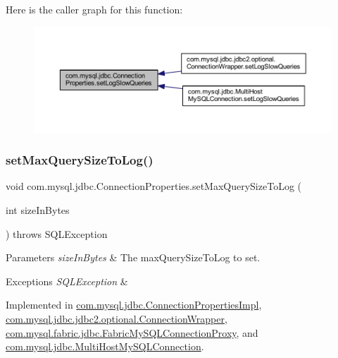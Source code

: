 Here is the caller graph for this function\+:\nopagebreak
\begin{figure}[H]
\begin{center}
\leavevmode
\includegraphics[width=350pt]{interfacecom_1_1mysql_1_1jdbc_1_1_connection_properties_a7dd83438187fa5956f663b84a604dce3_icgraph}
\end{center}
\end{figure}
\mbox{\label{interfacecom_1_1mysql_1_1jdbc_1_1_connection_properties_a65e15e4e1644fe1fb818777977237944}} 
\subsubsection{\texorpdfstring{set\+Max\+Query\+Size\+To\+Log()}{setMaxQuerySizeToLog()}}
{\footnotesize\ttfamily void com.\+mysql.\+jdbc.\+Connection\+Properties.\+set\+Max\+Query\+Size\+To\+Log (\begin{DoxyParamCaption}\item[{int}]{size\+In\+Bytes }\end{DoxyParamCaption}) throws S\+Q\+L\+Exception}


\begin{DoxyParams}{Parameters}
{\em size\+In\+Bytes} & The max\+Query\+Size\+To\+Log to set. \\
\hline
\end{DoxyParams}

\begin{DoxyExceptions}{Exceptions}
{\em S\+Q\+L\+Exception} & \\
\hline
\end{DoxyExceptions}


Implemented in \mbox{\hyperlink{classcom_1_1mysql_1_1jdbc_1_1_connection_properties_impl_a47edb53f9c786011c632b6aa2a524e93}{com.\+mysql.\+jdbc.\+Connection\+Properties\+Impl}}, \mbox{\hyperlink{classcom_1_1mysql_1_1jdbc_1_1jdbc2_1_1optional_1_1_connection_wrapper_ac2fc5533a1f39ec379f5641cd048a91f}{com.\+mysql.\+jdbc.\+jdbc2.\+optional.\+Connection\+Wrapper}}, \mbox{\hyperlink{classcom_1_1mysql_1_1fabric_1_1jdbc_1_1_fabric_my_s_q_l_connection_proxy_a66fb74ad3f8a78bb5d61c4c81a3fdcf6}{com.\+mysql.\+fabric.\+jdbc.\+Fabric\+My\+S\+Q\+L\+Connection\+Proxy}}, and \mbox{\hyperlink{classcom_1_1mysql_1_1jdbc_1_1_multi_host_my_s_q_l_connection_af7d68fcc0013bf2144e290097365b6ea}{com.\+mysql.\+jdbc.\+Multi\+Host\+My\+S\+Q\+L\+Connection}}.

